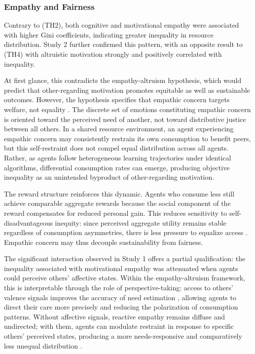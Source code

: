 \subsubsection{Empathy and Fairness}
Contrary to (TH2), both cognitive and motivational empathy were associated with higher Gini coefficients, indicating greater inequality in resource distribution. Study 2 further confirmed this pattern, with an opposite result to (TH4) with altruistic motivation strongly and positively correlated with inequality.

At first glance, this contradicts the empathy-altruism hypothesis, which would predict that other-regarding motivation promotes equitable as well as sustainable outcomes. However, the hypothesis specifies that empathic concern targets welfare, not equality \cite{Batson01041991}. The discrete set of emotions constituting empathic concern is oriented toward the perceived need of another, not toward distributive justice between all others. In a shared resource environment, an agent experiencing empathic concern may consistently restrain its own consumption to benefit peers, but this self-restraint does not compel equal distribution across all agents. Rather, as agents follow heterogeneous learning trajectories under identical algorithms, differential consumption rates can emerge, producing objective inequality as an unintended byproduct of other-regarding motivation.

The reward structure reinforces this dynamic. Agents who consume less still achieve comparable aggregate rewards because the social component of the reward compensates for reduced personal gain. This reduces sensitivity to self-disadvantageous inequity: since perceived aggregate utility remains stable regardless of consumption asymmetries, there is less pressure to equalize access \cite{heInfluenceEmpathicConcern2022}. Empathic concern may thus decouple sustainability from fairness.

The significant interaction observed in Study 1 offers a partial qualification: the inequality associated with motivational empathy was attenuated when agents could perceive others' affective states. Within the empathy-altruism framework, this is interpretable through the role of perspective-taking: access to others' valence signals improves the accuracy of need estimation \cite{batson1997perspective}, allowing agents to direct their care more precisely and reducing the polarization of consumption patterns. Without affective signals, reactive empathy remains diffuse and undirected; with them, agents can modulate restraint in response to specific others' perceived states, producing a more needs-responsive and comparatively less unequal distribution \cite{moreno-casasEthicsCareTragedy2021}.

